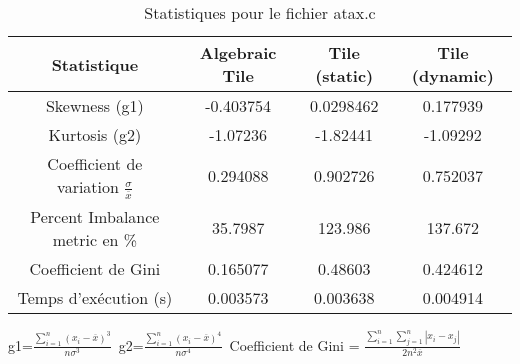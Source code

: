\documentclass{article}
\begin{document}
\begin{table}[htbp]
  \centering
  \caption{Statistiques pour le fichier atax.c}
  \begin{tabular}{|c|c|c|c|}
    \hline
    Statistique & Algebraic Tile & Tile (static) & Tile (dynamic) \\ 
    \hline
    Skewness (g1)  & -0.403754 & 0.0298462 & 0.177939 \\ 
    Kurtosis (g2)  & -1.07236 & -1.82441 & -1.09292 \\ 
    Coefficient de variation $ \frac{\sigma}{\overline{x}} $ & 0.294088 & 0.902726 & 0.752037\\ 
    Percent Imbalance metric en \% & 35.7987 & 123.986 & 137.672\\ 
    Coefficient de Gini  & 0.165077 & 0.48603 & 0.424612\\ 
    Temps d'exécution (s) &  0.003573    &  0.003638   &  0.004914   \\ 

    \hline
  \end{tabular}
\end{table}
g1=$ \frac{\sum_{i=1}^{n} (x_i - \overline{x})^3}{n\sigma^3} $\
g2=$ \frac{\sum_{i=1}^{n} (x_i - \overline{x})^4}{n\sigma^4} $\
Coefficient de Gini = $ \frac{\sum_{i=1}^{n}\sum_{j=1}^{n} |x_i - x_j|}{2n^2\overline{x}} $\
\newpage
\end{document}

